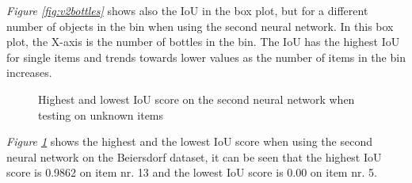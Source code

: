 \textit{Figure \ref{fig:v2bottles}} shows also the IoU in the box plot, but for a different number of objects in the bin when using the second neural network. In this box plot, the X-axis is the number of bottles in the bin. The IoU has the highest IoU for single items and trends towards lower values as the number of items in the bin increases.

\begin{figure}[h]
    \centering
    \hfill
    
    \caption{Highest and lowest IoU score on the second neural network when testing on unknown items}
    \label{fig:v2unknowniou2}
\end{figure}

\textit{Figure \ref{fig:v2unknowniou2}} shows the highest and the lowest IoU score when using the second neural network on the Beiersdorf dataset, it can be seen that the highest IoU score is 0.9862 on item nr. 13 and the lowest IoU score is 0.00 on item nr. 5.

